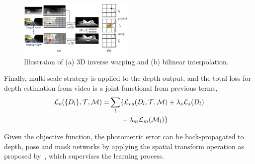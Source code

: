 \begin{figure}
\centering
\includegraphics[width=0.5\textwidth]{figures/3d_warping_comp.pdf}
\caption{Illustraion of (a) 3D inverse warping and (b) bilinear interpolation.}
\label{fig:3d_warping}
\vspace{-1\baselineskip}
\end{figure}

Finally, multi-scale strategy is applied to the depth output, and the total loss for depth estimation from video is a joint functional from previous terms,
\begin{align}
\label{eqn:full}
{\mathcal L}_{o}(\{D_l\}, {\mathcal T}, {\mathcal M}) =& \sum_l\{{\mathcal L}_{vs}(D_l,{\mathcal T},{\mathcal M}) + \lambda_s{\mathcal L}_{s}(D_l) \nonumber\\
&\text{~~~~~} + \lambda_m{\mathcal L}_{m}({\mathcal M}_l)\}
\end{align}

Given the objective function, the photometric error can be back-propagated to depth, pose and mask networks by applying the spatial transform operation as proposed by~\cite{jaderberg2015spatial}, which supervises the learning process.

